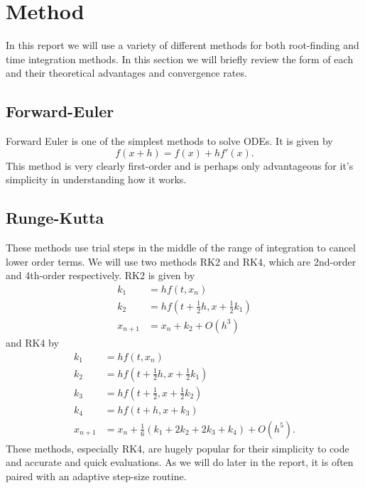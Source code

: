 \documentclass{article}
\begin{document}
\section*{Method}
In this report we will use a variety of different methods for both root-finding and time integration methods. In this section we will briefly review the form of each and their theoretical advantages and convergence rates. 

\subsection*{Forward-Euler}
Forward Euler is one of the simplest methods to solve ODEs. It is given by
\begin{equation}
    f(x+h) = f(x) + h f'(x).
\end{equation}
This method is very clearly first-order and is perhaps only advantageous for it's simplicity in understanding how it works. 

\subsection*{Runge-Kutta}
These methods use trial steps in the middle of the range of integration to cancel lower order terms. We will use two methods RK2 and RK4, which are 2nd-order and 4th-order respectively. RK2 is given by 
\begin{equation}
\begin{split}
    k_1 & = h  f(t,x_n) \\
    k_2 & = h  f(t+\frac{1}{2}h,x+\frac{1}{2}k_1) \\
    x_{n+1} & = x_n + k_2 + O(h^3)
\end{split}
\end{equation}
and RK4 by
\begin{equation}
\begin{split}
    k_1 & = h f(t,x_n)                                \\
    k_2 & = h f(t+\frac{1}{2}h,x+\frac{1}{2}k_1)      \\
    k_3 & = h f(t+\frac{1}{2},x+\frac{1}{2}k_2)        \\
    k_4 & = h f(t+h,x+k_3)                             \\
    x_{n+1} & = x_n + \frac{1}{6}(k_1+2 k_2 +2 k_3 + k_4) + O(h^5).
\end{split}
\end{equation}
These methods, especially RK4, are hugely popular for their simplicity to code and accurate and quick evaluations. As we will do later in the report, it is often paired with an adaptive step-size routine.
\end{document}
